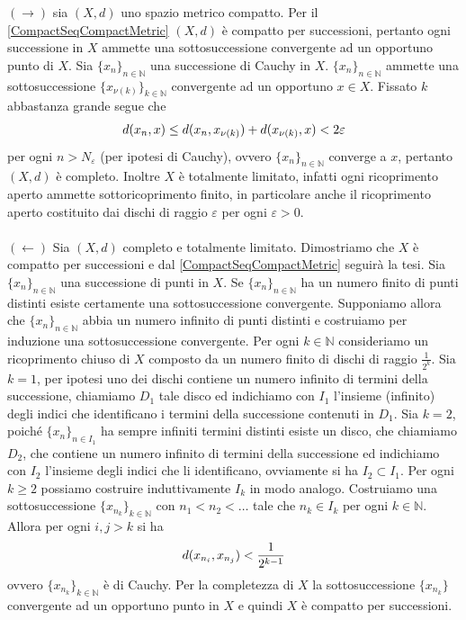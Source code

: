 \documentclass[oneside, 11pt]{amsbook}
\makeatletter
\newcommand{\0}{{(0)}}
\newcommand{\3}{{(3)}}
\theoremstyle{colonplain}
\theoremstyle{colondefinition}
\theoremstyle{colonremark}
\numberwithin{equation}{chapter}
\renewcommand{\proofname}{Dimostrazione}
\renewenvironment{proof}[1][\proofname]{\par
  \pushQED{\qed}%
  \normalfont \topsep6\p@\@plus6\p@\relax
  \trivlist
  \item[\hskip\labelsep\bfseries #1:]\ignorespaces
}{%
  \popQED\endtrivlist\@endpefalse
}
\makeatother
\begin{document}
\begin{proof}
$(\rightarrow)$ sia $(X, d)$ uno spazio metrico compatto. Per il \cref{CompactSeqCompactMetric} $(X, d)$ è compatto per successioni, pertanto ogni successione in $X$ ammette una sottosuccessione convergente ad un opportuno punto di $X$. Sia $\{x_n\}_{n \in \mathbb{N}}$ una successione di Cauchy in $X$. $\{x_n\}_{n \in \mathbb{N}}$ ammette una sottosuccessione $\{x_{\nu(k)}\}_{k \in \mathbb{N}}$ convergente ad un opportuno $x \in X$. Fissato $k$ abbastanza grande segue che 
\begin{align}
    d(x_n, x) \leq d(x_n, x_{\nu(k)}) + d(x_{\nu(k)}, x) < 2\varepsilon \notag
\end{align}
per ogni $n > N_\varepsilon$ (per ipotesi di Cauchy), ovvero $\{x_n\}_{n \in \mathbb{N}}$ converge a $x$, pertanto $(X, d)$ è completo. Inoltre $X$ è totalmente limitato, infatti ogni ricoprimento aperto ammette sottoricoprimento finito, in particolare anche il ricoprimento aperto costituito dai dischi di raggio $\varepsilon$ per ogni $\varepsilon > 0$. \\ \\
$(\leftarrow)$ Sia $(X, d)$ completo e totalmente limitato. Dimostriamo che $X$ è compatto per successioni e dal \cref{CompactSeqCompactMetric} seguirà la tesi. Sia $\{x_n\}_{n \in \mathbb{N}}$ una successione di punti in $X$. Se $\{x_n\}_{n \in \mathbb{N}}$ ha un numero finito di punti distinti esiste certamente una sottosuccessione convergente. Supponiamo allora che $\{x_n\}_{n \in \mathbb{N}}$ abbia un numero infinito di punti distinti e costruiamo per induzione una sottosuccessione convergente. Per ogni $k \in \mathbb{N}$ consideriamo un ricoprimento chiuso di $X$ composto da un numero finito di dischi di raggio $\frac{1}{2^k}$. Sia $k = 1$, per ipotesi uno dei dischi contiene un numero infinito di termini della successione, chiamiamo $D_1$ tale disco ed indichiamo con $I_1$ l'insieme (infinito) degli indici che identificano i termini della successione contenuti in $D_1$. Sia $k = 2$, poiché $\{x_n\}_{n \in I_1}$ ha sempre infiniti termini distinti esiste un disco, che chiamiamo $D_2$, che contiene un numero infinito di termini della successione ed indichiamo con $I_2$ l'insieme degli indici che li identificano, ovviamente si ha $I_2 \subset I_1$. Per ogni $k \geq 2$ possiamo costruire induttivamente $I_k$ in modo analogo. Costruiamo una sottosuccessione $\{x_{n_k}\}_{k \in \mathbb{N}}$ con $n_1 < n_2 < \dots$ tale che $n_k \in I_k$ per ogni $k \in \mathbb{N}$. Allora per ogni $i, j > k$ si ha 
\begin{align}
    d(x_{n_i}, x_{n_j}) < \frac{1}{2^{k - 1}} \notag
\end{align}
ovvero $\{x_{n_k}\}_{k \in \mathbb{N}}$ è di Cauchy. Per la completezza di $X$ la sottosuccessione $\{x_{n_k}\}$ convergente ad un opportuno punto in $X$ e quindi $X$ è compatto per successioni.
\end{proof}
\end{document}
